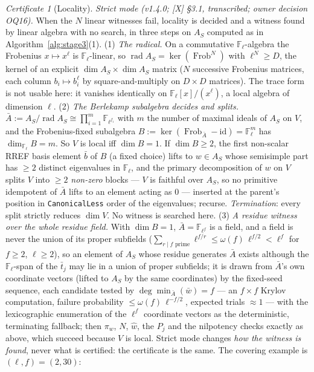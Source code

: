 \documentclass[11pt]{article}
\theoremstyle{remark}
\newtheorem{certificate}[theorem]{Certificate}
\newcommand{\F}{\mathbb{F}}
\newcommand{\Fl}{\F_\ell}
\DeclareMathOperator{\rad}{rad}
\DeclareMathOperator{\Frob}{Frob}
\begin{document}
\begin{certificate}[Locality]
\emph{Strict mode (v1.4.0; [X] \S3.1, transcribed; owner decision OQ16).} When the $N$ linear
witnesses fail, locality is decided and a witness found by linear algebra with no search, in
three steps on $A_S$ computed as in Algorithm~\ref{alg:stage3}(1).
(1) \emph{The radical.} On a commutative $\Fl$-algebra the Frobenius $x\mapsto x^\ell$ is
$\Fl$-linear, so $\rad A_S=\ker(\Frob^N)$ with $\ell^N\ge D$, the kernel of an explicit
$\dim A_S\times\dim A_S$ matrix ($N$ successive Frobenius matrices, each column
$b_i\mapsto b_i^\ell$ by square-and-multiply on $D\times D$ matrices). The trace form is not
usable here: it vanishes identically on $\Fl[x]/(x^\ell)$, a local algebra of dimension $\ell$.
(2) \emph{The Berlekamp subalgebra decides and splits.} $\bar A:=A_S/\rad A_S\cong\prod_{i=1}^m\F_{\ell^{f_i}}$
with $m$ the number of maximal ideals of $A_S$ on $V$, and the Frobenius-fixed subalgebra
$B:=\ker(\Frob_{\bar A}-\mathrm{id})=\Fl^m$ has $\dim_{\Fl}B=m$. So $V$ is local iff $\dim B=1$.
If $\dim B\ge2$, the first non-scalar RREF basis element $\bar b$ of $B$ (a fixed choice) lifts to
$w\in A_S$ whose semisimple part has $\ge2$ distinct eigenvalues in $\Fl$, and the primary
decomposition of $w$ on $V$ splits $V$ into $\ge2$ \emph{non-zero} blocks --- $V$ is faithful
over $A_S$, so no primitive idempotent of $\bar A$ lifts to an element acting as $0$ ---
inserted at the parent's position in \texttt{CanonicalLess} order of the eigenvalues; recurse.
\emph{Termination}: every split strictly reduces $\dim V$. No witness is searched here.
(3) \emph{A residue witness over the whole residue field.} With $\dim B=1$, $\bar A=\F_{\ell^f}$
is a field, and a field is never the union of its proper subfields
($\sum_{r\mid f\text{ prime}}\ell^{f/r}\le\omega(f)\,\ell^{f/2}<\ell^f$ for $f\ge2$, $\ell\ge2$),
so an element of $A_S$ whose residue generates $\bar A$ exists although the $\Fl$-span of the
$\bar t_j$ may lie in a union of proper subfields; it is drawn from $\bar A$'s own coordinate
vectors (lifted to $A_S$ by the same coordinates) by the fixed-seed sequence, each candidate
tested by $\deg\min_{\bar A}(\bar w)=f$ --- an $f\times f$ Krylov computation, failure
probability $\le\omega(f)\,\ell^{-f/2}$, expected trials $\approx1$ --- with the lexicographic
enumeration of the $\ell^f$ coordinate vectors as the deterministic, terminating fallback; then
$\pi_w$, $N$, $\hat w$, the $P_j$ and the nilpotency checks exactly as above, which succeed
because $V$ is local. Strict mode changes \emph{how the witness is found}, never what is
certified: the certificate is the same. The covering example is $(\ell,f)=(2,30)$:

\end{certificate}
\end{document}
